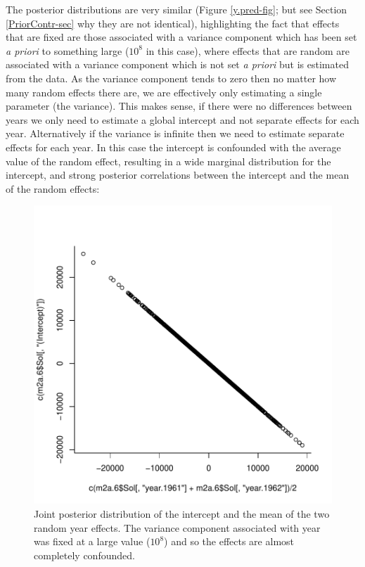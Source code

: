 \documentclass{article}
\begin{document}
The posterior distributions are very similar (Figure \ref{y.pred-fig}; but see Section \ref{PriorContr-sec} why they are not identical), highlighting the fact that effects that are fixed are those associated with a variance component which has been set \emph{a priori} to something large ($10^8$ in this case), where effects that are random are associated with a variance component which is not set \emph{a priori} but is estimated from the data. As the variance component tends to zero then no matter how many random effects there are, we are effectively only estimating a single parameter (the variance). This makes sense, if there were no differences between years we only need to estimate a global intercept and not separate effects for each year. Alternatively if the variance is infinite then we need to estimate separate effects for each year. In this case the intercept is confounded with the average value of the random effect, resulting in a wide marginal distribution for the intercept, and strong posterior correlations between the intercept and the mean of the random effects:

\begin{Schunk}
\end{Schunk}


\begin{figure}[!h]
\begin{center}
\includegraphics{Lecture2-052}
\end{center}
\caption{Joint posterior distribution of the intercept and the mean of the two random year effects. The variance component associated with year was fixed at a large value ($10^8$) and so the effects are almost completely confounded.}
\label{yfixed-fig}
\end{figure}
\end{document}

